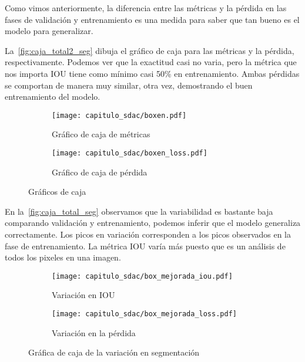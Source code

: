 Como vimos anteriormente, la diferencia entre las métricas y la pérdida en las
fases de validación y entrenamiento es una medida para saber que tan bueno es el
modelo para generalizar. 

La~\autoref{fig:caja_total2_seg} dibuja el gráfico de caja para las métricas y
la pérdida, respectivamente. Podemos ver que la exactitud casi no varia, pero la
métrica que nos importa IOU tiene como mínimo casi 50\% en entrenamiento. Ambas
pérdidas se comportan de manera muy similar, otra vez, demostrando el buen
entrenamiento del modelo.

\begin{figure}[]
    \centering
    \begin{subfigure}[b]{0.8\textwidth}
        \centering
       \texttt{[image: capitulo\_sdac/boxen.pdf]}
       \caption{Gráfico de caja de métricas}\label{fig:caja_acc2_seg} 
    \end{subfigure}

    \begin{subfigure}[b]{0.8\textwidth}
        \centering
       \texttt{[image: capitulo\_sdac/boxen\_loss.pdf]}
       \caption{Gráfico de caja de pérdida}\label{fig:caja_loss2_seg}
    \end{subfigure}
    \caption{Gráficos de caja}\label{fig:caja_total2_seg}
\end{figure}

En la~\autoref{fig:caja_total_seg} observamos que la variabilidad es bastante
baja comparando validación y entrenamiento, podemos inferir que el modelo
generaliza correctamente. Los picos en variación corresponden a los picos
observados en la fase de entrenamiento. La métrica IOU varía más puesto que es
un análisis de todos los pixeles en una imagen.

\begin{figure}[H]
    \centering
    \begin{subfigure}[b]{0.6\textwidth}
        \centering
       \texttt{[image: capitulo\_sdac/box\_mejorada\_iou.pdf]}
       \caption{Variación en IOU}\label{fig:caja_acc_seg} 
    \end{subfigure}

    \begin{subfigure}[b]{0.6\textwidth}
        \centering
       \texttt{[image: capitulo\_sdac/box\_mejorada\_loss.pdf]}
       \caption{Variación en la pérdida}\label{fig:caja_loss_seg}
    \end{subfigure}
    \caption{Gráfica de caja de la variación en segmentación}\label{fig:caja_total_seg}
\end{figure}

